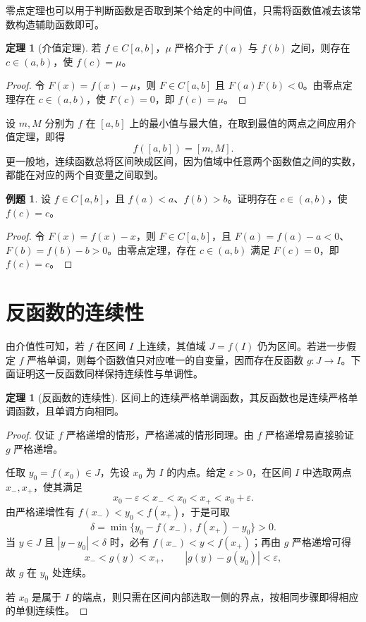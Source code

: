 \documentclass[UTF8,fontset=fandol,a4paper,12pt]{ctexart}
\theoremstyle{definition}
\newtheorem{theorem}[definition]{定理}
\newtheorem{example}[definition]{例题}
\begin{document}
零点定理也可以用于判断函数是否取到某个给定的中间值，只需将函数值减去该常数构造辅助函数即可。

\begin{theorem}[介值定理]
若 $f\in C[a,b]$，$\mu$ 严格介于 $f(a)$ 与 $f(b)$ 之间，则存在 $c\in(a,b)$，使 $f(c)=\mu$。
\end{theorem}
\begin{proof}
令 $F(x)=f(x)-\mu$，则 $F\in C[a,b]$ 且 $F(a)F(b)<0$。由零点定理存在 $c\in(a,b)$，使 $F(c)=0$，即 $f(c)=\mu$。
\end{proof}

设 $m,M$ 分别为 $f$ 在 $[a,b]$ 上的最小值与最大值，在取到最值的两点之间应用介值定理，即得
\[
 \boxed{f([a,b])=[m,M].}
\]
更一般地，连续函数总将区间映成区间，因为值域中任意两个函数值之间的实数，都能在对应的两个自变量之间取到。

\begin{example}
设 $f\in C[a,b]$，且 $f(a)<a$、$f(b)>b$。证明存在 $c\in(a,b)$，使 $f(c)=c$。
\end{example}
\begin{proof}
令 $F(x)=f(x)-x$，则 $F\in C[a,b]$，且 $F(a)=f(a)-a<0$、$F(b)=f(b)-b>0$。由零点定理，存在 $c\in(a,b)$ 满足 $F(c)=0$，即 $f(c)=c$。
\end{proof}

\section{反函数的连续性}
由介值性可知，若 $f$ 在区间 $I$ 上连续，其值域 $J=f(I)$ 仍为区间。若进一步假定 $f$ 严格单调，则每个函数值只对应唯一的自变量，因而存在反函数 $g:J\to I$。下面证明这一反函数同样保持连续性与单调性。

\begin{theorem}[反函数的连续性]
区间上的连续严格单调函数，其反函数也是连续严格单调函数，且单调方向相同。
\end{theorem}
\begin{proof}
仅证 $f$ 严格递增的情形，严格递减的情形同理。由 $f$ 严格递增易直接验证 $g$ 严格递增。

任取 $y_0=f(x_0)\in J$，先设 $x_0$ 为 $I$ 的内点。给定 $\varepsilon>0$，在区间 $I$ 中选取两点 $x_-,x_+$，使其满足
\[
 x_0-\varepsilon<x_-<x_0<x_+<x_0+\varepsilon.
\]
由严格递增性有 $f(x_-)<y_0<f(x_+)$，于是可取
\[
 \delta=\min\{y_0-f(x_-),\ f(x_+)-y_0\}>0.
\]
当 $y\in J$ 且 $|y-y_0|<\delta$ 时，必有 $f(x_-)<y<f(x_+)$；再由 $g$ 严格递增可得
\[
 x_-<g(y)<x_+,\qquad |g(y)-g(y_0)|<\varepsilon,
\]
故 $g$ 在 $y_0$ 处连续。

若 $x_0$ 是属于 $I$ 的端点，则只需在区间内部选取一侧的界点，按相同步骤即得相应的单侧连续性。
\end{proof}
\end{document}
